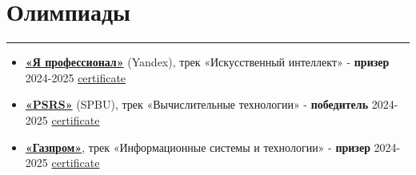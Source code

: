 \documentclass[a4paper,14pt]{article}
\begin{document}

\section*{Олимпиады}
\hrule
\vspace{0.5em}
\begin{itemize}
    \item \textbf{\href{https://yandex.ru/profi/?etext=}{«Я профессионал»}} (Yandex), трек «Искусственный интеллект» - \textbf{призер} 2024-2025 \href{https://github.com/Denigmma/Practice_LogBook/blob/main/Yandex/Я%20профессионал%20(olimp)/2024-2025/Нормативные%20документы%20и%20диплом/Диплом%20призера%20VIII%20сезона%20ЯП%20ИИ.pdf}{certificate}
    \item \textbf{\href{https://psrs.spbu.ru/}{«PSRS»}} (SPBU), трек «Вычислительные технологии» - \textbf{победитель} 2024-2025 \href{https://github.com/Denigmma/Practice_LogBook/blob/main/SPBU%20olympics%20Petropolitan%20Science%20(Re)Search/2024-2025/Diploma%20winner%2024-25.pdf}{certificate}
    \item \textbf{\href{https://studolymp.gazprom.ru/}{«Газпром»}}, трек «Информационные системы и технологии» - \textbf{призер} 2024-2025 \href{https://github.com/Denigmma/Practice_LogBook/blob/main/Gazprom/Диплом%20Мурадян%20Денис%20Степанович%20по%20профилю%20_Информационные%20системы%20и%20технологии_.pdf}{certificate}
\end{itemize}
\end{document}
